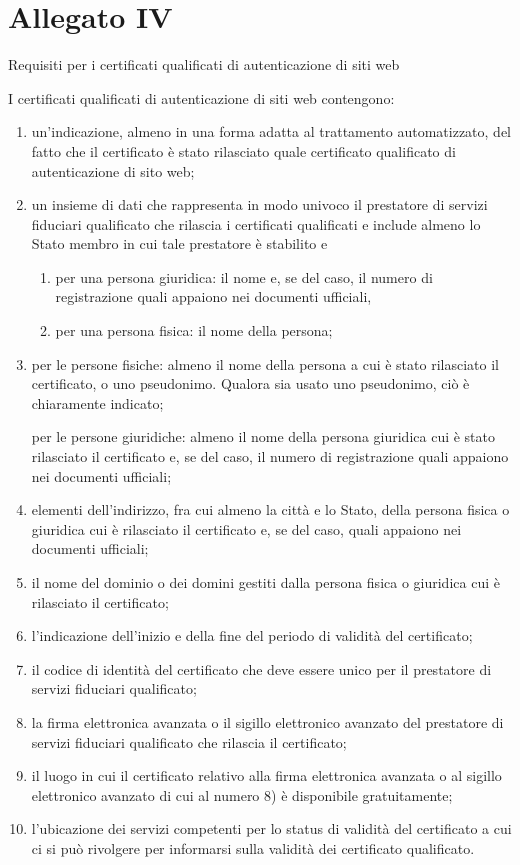 \section{Allegato IV}\label{sec:allegatoIVreg9102014}
Requisiti per i certificati qualificati di autenticazione di siti web\par 
I certificati qualificati di autenticazione di siti web contengono:
\begin{enumerate}
	\item un’indicazione, almeno in una forma adatta al trattamento automatizzato, del fatto che il certificato è stato rilasciato quale certificato qualificato di autenticazione di sito web;
	\item un insieme di dati che rappresenta in modo univoco il prestatore di servizi fiduciari qualificato che rilascia i certificati qualificati e include almeno lo Stato membro in cui tale prestatore è stabilito e
	\begin{enumerate}
		\item per una persona giuridica: il nome e, se del caso, il numero di registrazione quali appaiono nei documenti ufficiali,
		\item 	
		per una persona fisica: il nome della persona;
	\end{enumerate}
\item per le persone fisiche: almeno il nome della persona a cui è stato rilasciato il certificato, o uno pseudonimo. Qualora sia usato uno pseudonimo, ciò è chiaramente indicato;

per le persone giuridiche: almeno il nome della persona giuridica cui è stato rilasciato il certificato e, se del caso, il numero di registrazione quali appaiono nei documenti ufficiali;
\item elementi dell’indirizzo, fra cui almeno la città e lo Stato, della persona fisica o giuridica cui è rilasciato il certificato e, se del caso, quali appaiono nei documenti ufficiali;
\item il nome del dominio o dei domini gestiti dalla persona fisica o giuridica cui è rilasciato il certificato;
\item 	
l’indicazione dell’inizio e della fine del periodo di validità del certificato;
\item 	
il codice di identità del certificato che deve essere unico per il prestatore di servizi fiduciari qualificato;
\item la firma elettronica avanzata o il sigillo elettronico avanzato del prestatore di servizi fiduciari qualificato che rilascia il certificato;
\item 	
il luogo in cui il certificato relativo alla firma elettronica avanzata o al sigillo elettronico avanzato di cui al numero 8) è disponibile gratuitamente;
\item 	
l’ubicazione dei servizi competenti per lo status di validità del certificato a cui ci si può rivolgere per informarsi sulla validità dei certificato qualificato.
\end{enumerate}
